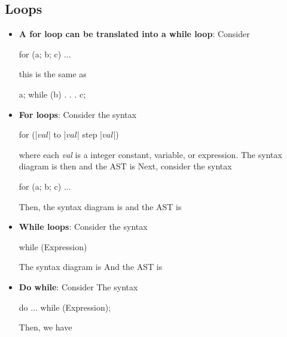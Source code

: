 \documentclass{report}
\begin{document}
    \pagebreak 
    \subsection{Loops}
    \begin{itemize}
        \item \textbf{A for loop can be translated into a while loop}: Consider 
            \bigbreak \noindent 
            \begin{cppcode}
            for (a; b; c) ...
            \end{cppcode}
            \bigbreak \noindent 
            this is the same as
            \bigbreak \noindent 
            \begin{cppcode}
            a;
            while (b) {
                .
                .
                .
                c;
            }
            \end{cppcode}
        \item \textbf{For loops}: Consider the syntax
            \bigbreak \noindent 
            \begin{cppcode}
            for (|$val$| to |$val$| step |$val$|)
            \end{cppcode}
            \bigbreak \noindent 
            where each \textit{val} is a integer constant, variable, or expression. The syntax diagram is then
            \bigbreak \noindent 
            \bigbreak \noindent 
            and the AST is 
            \bigbreak \noindent 
            \bigbreak \noindent 
            Next, consider the syntax
            \bigbreak \noindent 
            \begin{cppcode}
            for (a; b; c) ...
            \end{cppcode}
            \bigbreak \noindent 
            Then, the syntax diagram is
            \bigbreak \noindent 
            \bigbreak \noindent 
            and the AST is
            \bigbreak \noindent 
        \item \textbf{While loops}: Consider the syntax
            \bigbreak \noindent 
            \begin{cppcode}
            while (Expression)
            \end{cppcode}
            \bigbreak \noindent 
            The syntax diagram is 
            \bigbreak \noindent 
            \bigbreak \noindent 
            And the AST is
            \bigbreak \noindent 
        \item \textbf{Do while}: Consider The syntax
            \bigbreak \noindent 
            \begin{cppcode}
                do ... while (Expression);
            \end{cppcode}
            \bigbreak \noindent 
            Then, we have
            \bigbreak \noindent 
            \bigbreak \noindent 

    \end{itemize}
\end{document}
